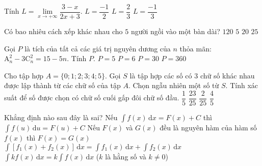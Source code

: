 \begin{ex}%
Tính $L=\lim\limits_{x\to+\infty}\dfrac{3-x}{2x+3}$.
{\True $ L=\dfrac{-1}{2}$}  
{$ L=\dfrac{2}{3}$}  
{$ L=\dfrac{-1}{3}$}
\end{ex}

\begin{ex}%
Có bao nhiêu cách xếp khác nhau cho $5$ người ngồi vào một bàn dài?
\choice
{\True $120$}  
{$5$}  
{$20$}  
{$25$}
\end{ex}

\begin{ex}%
Gọi $P$ là tích của tất cả các giá trị nguyên dương của $n$ thỏa mãn:  $\mathrm{A}_{n}^{2}-3\mathrm{C}_{n}^{2}=15-5n$. Tính $P$.
\choice
{$P=5$}  
{$P=6$}  
{\True $P=30$}  
{$P=360$}
\end{ex}

\begin{ex}%
Cho tập hợp $A=\{0;1;2;3;4;5\}$. Gọi $S$ là tập hợp các số có $3$ chữ số khác nhau được lập thành từ các chữ số của tập $A$. Chọn ngẫu nhiên một số từ $S$. Tính xác suất để số được chọn có chữ số cuối gấp đôi chữ số đầu.
\choice
{$\dfrac{1}{5}$}  
{$\dfrac{23}{25}$}  
{\True $\dfrac{2}{25}$}  
{$\dfrac{4}{5}$}
\end{ex}

\begin{ex}%
Khẳng định nào sau đây là sai?
\choice
{Nếu $\displaystyle\int f(x) \mathrm{\,d}x=F(x)+C$ thì $\displaystyle\int f(u)\mathrm{\,d}u=F(u)+C$}  
{\True Nếu $F(x)$ và $G(x)$ đều là nguyên hàm của hàm số $f(x)$ thì $F(x)=G(x)$}  
{$\displaystyle\int\left[f_1(x)+f_2(x)\right]\mathrm{\,d}x=\displaystyle\int f_1(x)\mathrm{\,d}x+\displaystyle\int f_2(x)\mathrm{\,d}x$}  
{$\displaystyle\int kf(x)\mathrm{\,d}x=k\displaystyle\int f(x)\mathrm{\,d}x$ ($k$ là hằng số và $k\ne 0$)}
\end{ex}

